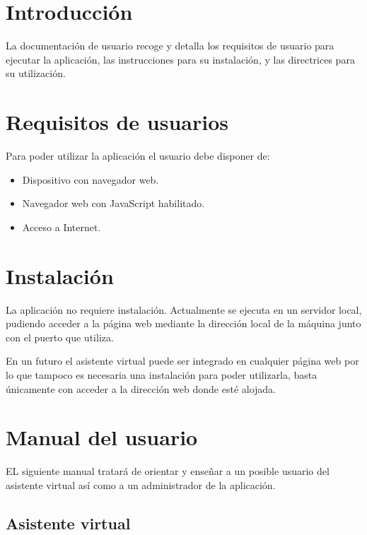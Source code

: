 
\section{Introducción}

La documentación de usuario recoge y detalla los requisitos de usuario para ejecutar la aplicación, las instrucciones para su instalación, y las directrices para su utilización.

\section{Requisitos de usuarios}

Para poder utilizar la aplicación el usuario debe disponer de:

\begin{itemize}
\tightlist
\item Dispositivo con navegador web.
\item Navegador web con JavaScript habilitado.
\item Acceso a Internet.
\end{itemize}

\section{Instalación}

La aplicación no requiere instalación. Actualmente se ejecuta en un servidor local, pudiendo acceder a la página web mediante la dirección local de la máquina junto con el puerto que utiliza.

En un futuro el asistente virtual puede ser integrado en cualquier página web por lo que tampoco es necesaria una instalación para poder utilizarla, basta únicamente con acceder a la dirección web donde esté alojada.


\section{Manual del usuario}

EL siguiente manual tratará de orientar y enseñar a un posible usuario del asistente virtual así como a un administrador de la aplicación.

\subsection{Asistente virtual}

